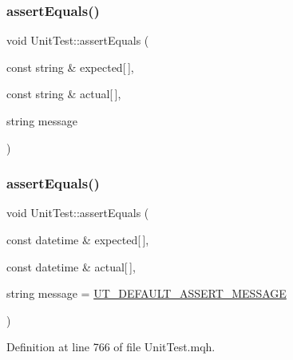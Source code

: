 \subsubsection{\texorpdfstring{assert\+Equals()}{assertEquals()}\hspace{0.1cm}{\footnotesize\ttfamily [26/28]}}
{\footnotesize\ttfamily void Unit\+Test\+::assert\+Equals (\begin{DoxyParamCaption}\item[{const string \&}]{expected\mbox{[}$\,$\mbox{]},  }\item[{const string \&}]{actual\mbox{[}$\,$\mbox{]},  }\item[{string}]{message }\end{DoxyParamCaption})}

\mbox{\label{class_unit_test_a2d5c3274f434977879697be4cf03dc70}} 
\subsubsection{\texorpdfstring{assert\+Equals()}{assertEquals()}\hspace{0.1cm}{\footnotesize\ttfamily [27/28]}}
{\footnotesize\ttfamily void Unit\+Test\+::assert\+Equals (\begin{DoxyParamCaption}\item[{const datetime \&}]{expected\mbox{[}$\,$\mbox{]},  }\item[{const datetime \&}]{actual\mbox{[}$\,$\mbox{]},  }\item[{string}]{message = {\ttfamily \mbox{\hyperlink{_unit_test_8mqh_a96f5d62188d09039ebc3f443c9120e39}{U\+T\+\_\+\+D\+E\+F\+A\+U\+L\+T\+\_\+\+A\+S\+S\+E\+R\+T\+\_\+\+M\+E\+S\+S\+A\+GE}}} }\end{DoxyParamCaption})}



Definition at line 766 of file Unit\+Test.\+mqh.

\mbox{\label{class_unit_test_adabe969b121acfc3c1d6c1df584193c8}} 
